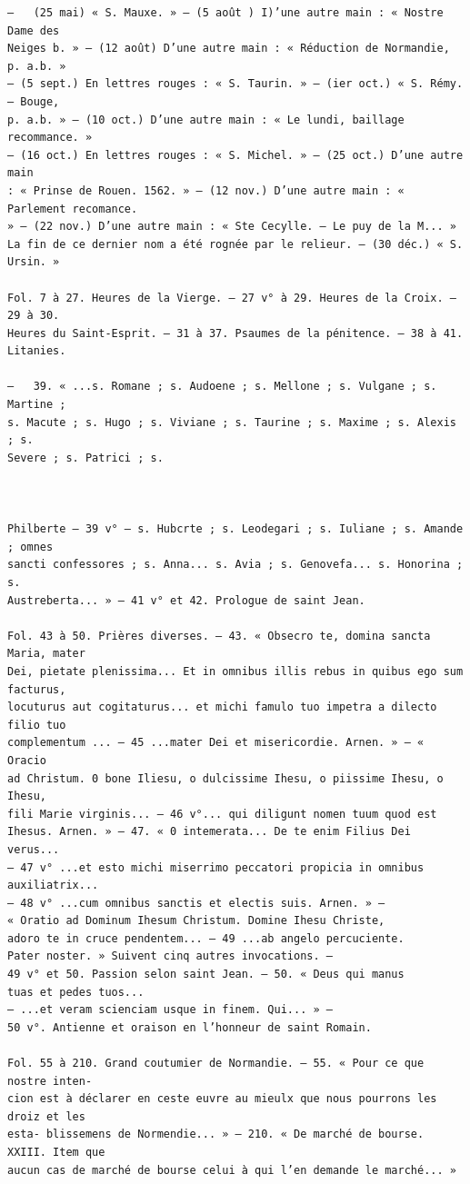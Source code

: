 \documentclass[a4paper,12pt,twoside]{book}
\begin{document}
\begin{verbatim}
—	(25 mai) « S. Mauxe. » — (5 août ) I)’une autre main : « Nostre Dame des 
Neiges b. » — (12 août) D’une autre main : « Réduction de Normandie, p. a.b. » 
— (5 sept.) En lettres rouges : « S. Taurin. » — (ier oct.) « S. Rémy. — Bouge,
p. a.b. » — (10 oct.) D’une autre main : « Le lundi, baillage recommance. » 
— (16 oct.) En lettres rouges : « S. Michel. » — (25 oct.) D’une autre main 
: « Prinse de Rouen. 1562. » — (12 nov.) D’une autre main : « Parlement recomance.
» — (22 nov.) D’une autre main : « Ste Cecylle. — Le puy de la M... »
La fin de ce dernier nom a été rognée par le relieur. — (30 déc.) « S. 
Ursin. »

Fol. 7 à 27. Heures de la Vierge. — 27 v° à 29. Heures de la Croix. — 29 à 30.
Heures du Saint-Esprit. — 31 à 37. Psaumes de la pénitence. — 38 à 41. Litanies.

—	39. « ...s. Romane ; s. Audoene ; s. Mellone ; s. Vulgane ; s. Martine ;
s. Macute ; s. Hugo ; s. Viviane ; s. Taurine ; s. Maxime ; s. Alexis ; s.
Severe ; s. Patrici ; s.



Philberte — 39 v° — s. Hubcrte ; s. Leodegari ; s. Iuliane ; s. Amande ; omnes
sancti confessores ; s. Anna... s. Avia ; s. Genovefa... s. Honorina ; s. 
Austreberta... » — 41 v° et 42. Prologue de saint Jean.

Fol. 43 à 50. Prières diverses. — 43. « Obsecro te, domina sancta Maria, mater
Dei, pietate plenissima... Et in omnibus illis rebus in quibus ego sum facturus,
locuturus aut cogitaturus... et michi famulo tuo impetra a dilecto filio tuo 
complementum ... — 45 ...mater Dei et misericordie. Arnen. » — « Oracio 
ad Christum. 0 bone Iliesu, o dulcissime Ihesu, o piissime Ihesu, o Ihesu, 
fili Marie virginis... — 46 v°... qui diligunt nomen tuum quod est
Ihesus. Arnen. » — 47. « 0 intemerata... De te enim Filius Dei verus...
— 47 v° ...et esto michi miserrimo peccatori propicia in omnibus auxiliatrix...
— 48 v° ...cum omnibus sanctis et electis suis. Arnen. » —
« Oratio ad Dominum Ihesum Christum. Domine Ihesu Christe, 
adoro te in cruce pendentem... — 49 ...ab angelo percuciente.
Pater noster. » Suivent cinq autres invocations. — 
49 v° et 50. Passion selon saint Jean. — 50. « Deus qui manus
tuas et pedes tuos...
— ...et veram scienciam usque in finem. Qui... » — 
50 v°. Antienne et oraison en l’honneur de saint Romain.

Fol. 55 à 210. Grand coutumier de Normandie. — 55. « Pour ce que nostre inten- 
cion est à déclarer en ceste euvre au mieulx que nous pourrons les droiz et les 
esta- blissemens de Normendie... » — 210. « De marché de bourse. XXIII. Item que
aucun cas de marché de bourse celui à qui l’en demande le marché... »


\end{verbatim}
\end{document}
